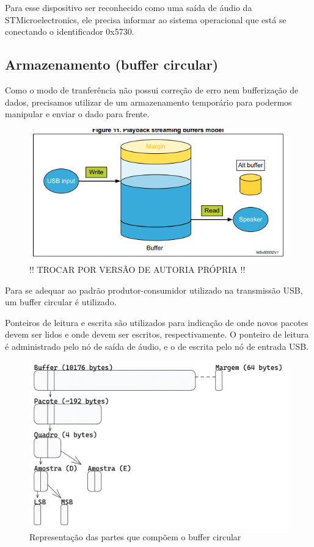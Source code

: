 Para esse dispositivo ser reconhecido como uma saída de áudio da STMicroelectronics, ele precisa informar ao sistema operacional que está se conectando o identificador 0x5730.

\subsection{Armazenamento (buffer circular)}
Como o modo de tranferência não possui correção de erro nem bufferização de dados, precisamos utilizar de um armazenamento temporário para podermos manipular e enviar o dado para frente.
\begin{figure}[!h]
  \includegraphics[scale=0.5]{figuras/circular-buffer.png}
  \caption{!! TROCAR POR VERSÃO DE AUTORIA PRÓPRIA !!}
  \label{fig:circularBuffer}
\end{figure}

Para se adequar ao padrão produtor-consumidor utilizado na transmissão USB, um buffer circular é utilizado. 

Ponteiros de leitura e escrita são utilizados para indicação de onde novos pacotes devem ser lidos e onde devem ser escritos, respectivamente. O ponteiro de leitura é administrado pelo nó de saída de áudio, e o de escrita pelo nó de entrada USB.

\begin{figure}[!h]
  \includegraphics[scale=0.4]{figuras/buffer.png}
  \caption{Representação das partes que compõem o buffer circular}
  \label{fig:bufferBytes}
\end{figure}

